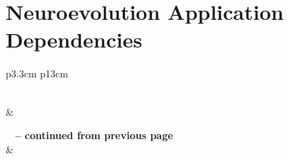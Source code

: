 
\chapter{Neuroevolution Application Dependencies}
\label{appendix:python_dependencies}

\begin{center}
\begin{longtable}{p{3.3cm} p{13cm}}
\caption[Dependencies]{Dependencies} \label{tab:neuroevolution_dependencies} \\

\hline {} &  \\ \hline 
\endfirsthead

{{\bfseries \tablename\ \thetable{} -- continued from previous page}} \\
\hline {} &  \\ \hline 
\endhead

\hline {} \\ \hline
\endfoot

\hline \hline
\endlastfoot


\end{longtable}
\end{center}
